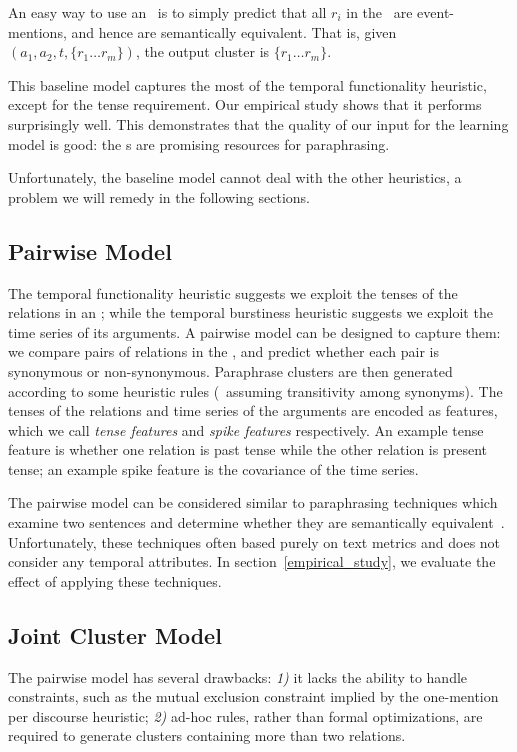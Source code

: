 An easy way to use an \bag\ is to simply predict that all $r_i$
in the \bag\ are event-mentions, and hence are semantically equivalent. That is,
given \bag\ $(a_1,a_2,t,\{r_1\ldots r_m\})$, the output cluster is
$\{r_1\ldots r_m\}$.

This baseline model captures the most of the temporal functionality heuristic,
except for the tense requirement. Our empirical study shows that it performs
surprisingly well. This demonstrates that the quality of our input for the
learning model is good: the \bag s are promising resources for paraphrasing.

Unfortunately, the baseline model cannot deal with the other
heuristics, a problem we will remedy in the following sections.

\subsection{Pairwise Model}
\label{section_news_spike}
The temporal functionality heuristic suggests we exploit the tenses
of the relations in an \bag; while the temporal burstiness heuristic suggests we
exploit the time series of its arguments. A pairwise model can be designed to
capture them: we compare pairs of relations in the \bag, and predict whether
each pair is synonymous or non-synonymous.  Paraphrase clusters are then
generated according to some heuristic rules (\eg\ assuming transitivity among
synonyms). The tenses of the relations and time series of the arguments are
encoded as features, which we call {\em tense features} and {\em spike features}
respectively. An example tense feature is whether one relation is past tense
while the other relation is present tense; an example spike feature is the
covariance of the time series.

The pairwise model can be considered similar to paraphrasing
techniques which examine two sentences and determine whether they are
semantically equivalent~\cite{dolan2005automatically,SocherEtAl2011:PoolRAE}. 
Unfortunately, these techniques often based purely on text metrics and does not
consider any temporal attributes. In section~\ref{empirical_study}, we evaluate the effect of
applying these techniques. 

\subsection{Joint Cluster Model}
\label{section_joint_cluster_model}
The pairwise model has several drawbacks: \textit{1)} it lacks the ability to
handle constraints, such as the mutual exclusion constraint implied by the
one-mention per discourse heuristic; \textit{2)} ad-hoc rules, rather than
formal optimizations, are required to generate clusters containing more than two
relations.

